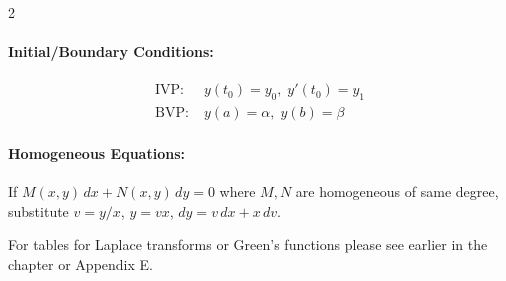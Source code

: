 \begin{multicols}{2}
\paragraph{Initial/Boundary Conditions:}
\begin{align*}
\text{IVP:}\; &y(t_0) = y_0,\; y'(t_0) = y_1\\
\text{BVP:}\; &y(a) = \alpha,\; y(b) = \beta
\end{align*}

\paragraph{Homogeneous Equations:}
If $M(x,y)\,dx + N(x,y)\,dy = 0$ where $M,N$ are homogeneous of same degree, substitute $v = y/x$, $y = vx$, $dy = v\,dx + x\,dv$.

\end{multicols}

\bigskip 

\noindent For tables for Laplace transforms or Green's functions please see earlier in the chapter or Appendix E.
\newpage

\practice{}

